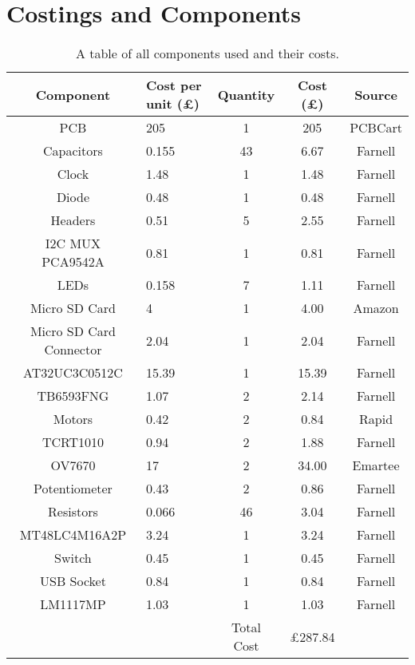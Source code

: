 \chapter{Costings and Components} \label{Appendix:Costings}

\begin{table}
\centering
\caption{A table of all components used and their costs.}
\label{table:Costings}
\begin{tabular}{cp{2cm}ccc} \toprule
\textbf{Component}	&	\textbf{Cost per unit} (\pounds)	& \textbf{Quantity} 	&	\textbf{Cost} (\pounds)		&	\textbf{Source}		\\ \toprule
PCB			&	205						&	1		&	205					&	PCBCart		\\ \midrule
Capacitors	&	0.155 					& 	43		& 	6.67 				& 	Farnell 	\\ \midrule
Clock 		& 	1.48					& 	1		&	1.48 				& 	Farnell		\\ \midrule
Diode		&	0.48					&	1		&	0.48				&	Farnell 	\\ \midrule
Headers		&	0.51 					&	5		&	2.55				&	Farnell 	\\ \midrule
I2C MUX PCA9542A &	0.81				&	1		&	0.81				&	Farnell		\\ \midrule
LEDs 		&	0.158					&	7		& 	1.11 				&	Farnell		\\ \midrule
Micro SD Card &	4						&	1		&	4.00 				&	Amazon 		\\ \midrule
Micro SD Card Connector & 2.04			&	1		&	2.04				&	Farnell		\\ \midrule
AT32UC3C0512C	&15.39					&	1		&	15.39				&	Farnell		\\ \midrule
TB6593FNG 	&	1.07 					&	2 		&	2.14 				&	Farnell 	\\ \midrule
Motors  	&	0.42					&	2		&	0.84				&	Rapid 		\\ \midrule
TCRT1010	& 	0.94 					&	2		&	1.88 				&	Farnell 	\\ \midrule
OV7670		&	17						&	2		&	34.00				& 	Emartee		\\ \midrule
Potentiometer	&	0.43				&	2		&	0.86				&	Farnell 	\\ \midrule
Resistors	&	0.066 					& 	46		&	3.04 				&	Farnell 	\\ \midrule
MT48LC4M16A2P	& 3.24  				& 	1		&	3.24 				&	Farnell		\\ \midrule
Switch		&	0.45					&	1		&	0.45				&	Farnell 	\\ \midrule
USB Socket	&	0.84 					&	1		& 	0.84 				&	Farnell 	\\ \midrule
LM1117MP	&	1.03					&	1		&	1.03	 			&	Farnell		\\  \bottomrule %
\multicolumn{2}{c}{ }					& Total Cost  & \pounds 287.84		&	\multicolumn{1}{c}{ }			\\ \cmidrule{3-4}
\end{tabular}
\end{table}


